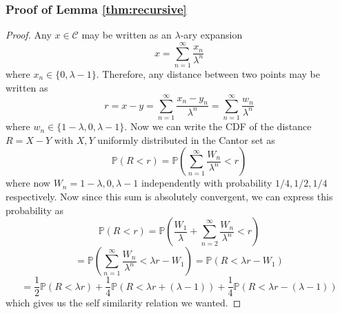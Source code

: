 \documentclass{article}
\newcommand{\prob}[1]{\mathbb{P}\left(#1\right)}
\begin{document}
\subsubsection{Proof of Lemma \ref{thm:recursive}}
\label{lemma1}
\begin{proof}
Any $x \in \mathcal{C}$ may be written as an $\lambda$-ary expansion
\begin{equation}
    x = \sum_{n=1}^{\infty}\frac{x_n}{\lambda^n}
\end{equation}
where $x_n\in\{0, \lambda-1\}$. Therefore, any distance between two points may be written as
\begin{equation}
    r = x-y = \sum_{n=1}^{\infty} \frac{x_n-y_n}{\lambda^n} = \sum_{n=1}^{\infty}\frac{w_n}{\lambda^n}
\end{equation}
where $w_n \in \{1-\lambda, 0, \lambda -1\}$. Now we can write the CDF of the distance $R = X-Y$ with $X,Y$ uniformly distributed in the Cantor set as
\begin{equation}
    \prob{R < r} = \prob{\sum_{n=1}^{\infty} \frac{W_n}{\lambda^n} < r}
\end{equation}
where now $W_n = 1-\lambda, 0, \lambda-1$ independently with probability $1/4, 1/2,1/4$ respectively. Now since this sum is absolutely convergent, we can express this probability as
\begin{equation}
    \prob{R<r} = \prob{\frac{W_1}{\lambda} + \sum_{n=2}^{\infty}\frac{W_n}{\lambda^n} < r}
\end{equation}
\begin{equation}
    = \prob{\sum_{n=1}^{\infty} \frac{W_n}{\lambda^n} < \lambda r - W_1} = \prob{R<\lambda r-W_1}
\end{equation}
\begin{equation}
    = \frac{1}{2}\prob{R < \lambda r} + \frac{1}{4}\prob{R < \lambda r + (\lambda -1)} + \frac{1}{4}\prob{R < \lambda r - (\lambda - 1)}
\end{equation}
which gives us the self similarity relation we wanted.
\end{proof}

    
\end{document}

